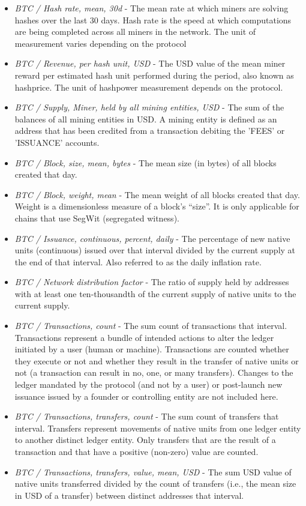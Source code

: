 \begin{itemize}
    \item \textit{BTC / Hash rate, mean, 30d} - The mean rate at which miners are solving hashes over the last 30 days. Hash rate is the speed at which computations are being completed across all miners in the network. The unit of measurement varies depending on the protocol
    \item \textit{BTC / Revenue, per hash unit, USD} - The USD value of the mean miner reward per estimated hash unit performed during the period, also known as hashprice. The unit of hashpower measurement depends on the protocol.
    \item \textit{BTC / Supply, Miner, held by all mining entities, USD} - The sum of the balances of all mining entities in USD. A mining entity is defined as an address that has been credited from a transaction debiting the 'FEES' or 'ISSUANCE' accounts.
    \item \textit{BTC / Block, size, mean, bytes} - The mean size (in bytes) of all blocks created that day.
    \item \textit{BTC / Block, weight, mean} - The mean weight of all blocks created that day. Weight is a dimensionless measure of a block’s “size”. It is only applicable for chains that use SegWit (segregated witness).
    \item \textit{BTC / Issuance, continuous, percent, daily} - The percentage of new native units (continuous) issued over that interval divided by the current supply at the end of that interval. Also referred to as the daily inflation rate.
    \item \textit{BTC / Network distribution factor} - The ratio of supply held by addresses with at least one ten-thousandth of the current supply of native units to the current supply.
    \item \textit{BTC / Transactions, count} - The sum count of transactions that interval. Transactions represent a bundle of intended actions to alter the ledger initiated by a user (human or machine). Transactions are counted whether they execute or not and whether they result in the transfer of native units or not (a transaction can result in no, one, or many transfers). Changes to the ledger mandated by the protocol (and not by a user) or post-launch new issuance issued by a founder or controlling entity are not included here.
    \item \textit{BTC / Transactions, transfers, count} - The sum count of transfers that interval. Transfers represent movements of native units from one ledger entity to another distinct ledger entity. Only transfers that are the result of a transaction and that have a positive (non-zero) value are counted.
    \item \textit{BTC / Transactions, transfers, value, mean, USD} - The sum USD value of native units transferred divided by the count of transfers (i.e., the mean size in USD of a transfer) between distinct addresses that interval.
\end{itemize}